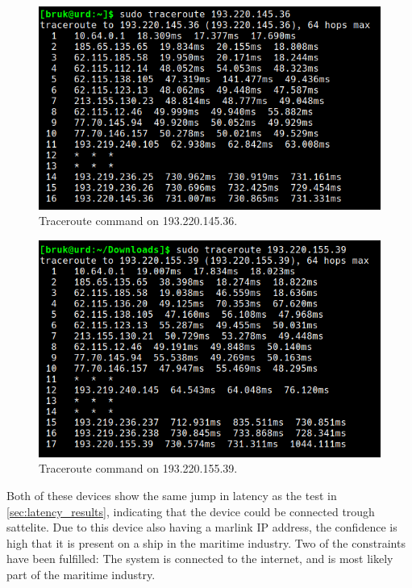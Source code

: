 \begin{figure} [H]
    \centering
    \includegraphics[scale=0.4]{Figurer/marlink_161_2.png}
    \caption{Traceroute command on 193.220.145.36.}
    \label{fig:marlink_traceroute_2}
\end{figure}

\begin{figure} [H]
    \centering
    \includegraphics[scale=0.4]{Figurer/marlink_161_1.png}
    \caption{Traceroute command on 193.220.155.39.}
    \label{fig:marlink_traceroute_1}
\end{figure}

Both of these devices show the same jump in latency as the test in \cref{sec:latency_results}, indicating that the device could be connected trough sattelite. Due to this device also having a marlink IP address, the confidence is high that it is present on a ship in the maritime industry. Two of the constraints have been fulfilled: The system is connected to the internet, and is most likely part of the maritime industry. 

